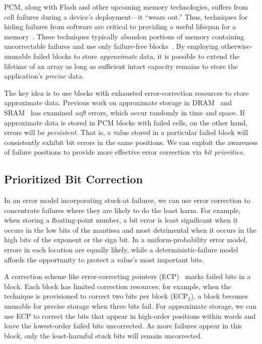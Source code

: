 \documentclass[prodmode,acmtocs]{acmsmall}
\begin{document}
PCM, along with Flash and other upcoming memory technologies, suffers from cell
failures during a device's deployment---it ``wears out.'' Thus, techniques for hiding failures from
software are critical to providing a useful lifespan for a
memory~\cite{pcm-dram-alt}.
These techniques typically abandon portions of memory containing
uncorrectable failures and use only failure-free blocks~\cite{ecp,payg,safer}.
By employing otherwise-unusable failed blocks to
store \emph{approximate} data, it is possible to extend the
lifetime of an array as long as sufficient intact capacity remains to
store the application's \emph{precise} data.

The key idea is to use blocks with exhausted
error-correction resources to store approximate data. Previous work on
approximate storage in DRAM~\cite{flikker} and SRAM~\cite{truffle} has examined
\emph{soft} errors, which occur randomly in time and space.
If approximate data is stored in PCM blocks with failed cells, on the other
hand, errors will be
\emph{persistent}. That is, a value stored in a particular failed
block will consistently exhibit bit errors in the same positions.
We can
exploit the awareness of failure positions to provide more effective
error correction via \emph{bit priorities}.

\subsection{Prioritized Bit Correction}
\label{sec:bitprior}

In an error model incorporating
stuck-at failures, we can use error correction to concentrate
failures
where they are likely to do the least harm. For example, when storing
a floating-point number, a bit error is least significant when it
occurs in the low bits of the mantissa and most detrimental when it
occurs in the high bits of the exponent or the sign bit. In a uniform-probability
error model, errors in each location are equally likely, while a
deterministic-failure model affords the opportunity to protect
a value's most important bits.

A correction scheme like error-correcting pointers (ECP)~\cite{ecp} marks failed bits in a
block. Each block has limited correction resources; for example,
when the technique is provisioned to correct two bits per block (ECP$_2$),
a block becomes unusable for precise storage when three
bits fail. For approximate storage, we
can use ECP to correct the bits that appear in high-order positions
within words and leave the lowest-order failed bits uncorrected. As
more failures appear in this block, only the least-harmful stuck bits will
remain uncorrected.
\end{document}
